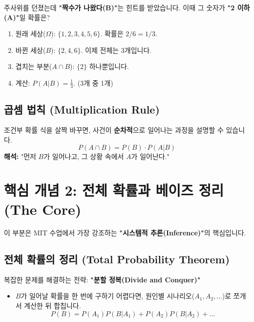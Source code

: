 \documentclass[11pt,a4paper]{book}
\theoremstyle{definition}
\begin{document}
\begin{examplebox}[title={주사위 던지기}]
주사위를 던졌는데 \textbf{"짝수가 나왔다(B)"}는 힌트를 받았습니다. 이때 그 숫자가 \textbf{"2 이하(A)"}일 확률은?
\begin{enumerate}
    \item 원래 세상($\Omega$): $\{1, 2, 3, 4, 5, 6\}$. 확률은 $2/6 = 1/3$.
    \item 바뀐 세상($B$): $\{2, 4, 6\}$. 이제 전체는 3개입니다.
    \item 겹치는 부분($A \cap B$): $\{2\}$ 하나뿐입니다.
    \item 계산: $P(A|B) = \frac{1}{3}$. (3개 중 1개)
\end{enumerate}
\end{examplebox}

\subsection{곱셈 법칙 (Multiplication Rule)}
조건부 확률 식을 살짝 바꾸면, 사건이 \textbf{순차적}으로 일어나는 과정을 설명할 수 있습니다.
\[ P(A \cap B) = P(B) \cdot P(A|B) \]
\textbf{해석:} "먼저 $B$가 일어나고, 그 상황 속에서 $A$가 일어난다."

\section{핵심 개념 2: 전체 확률과 베이즈 정리 (The Core)}

이 부분은 MIT 수업에서 가장 강조하는 \textbf{"시스템적 추론(Inference)"}의 핵심입니다.

\subsection{전체 확률의 정리 (Total Probability Theorem)}
복잡한 문제를 해결하는 전략: \textbf{"분할 정복(Divide and Conquer)"}
\begin{itemize}
    \item $B$가 일어날 확률을 한 번에 구하기 어렵다면, 원인별 시나리오($A_1, A_2, \dots$)로 쪼개서 계산한 뒤 합칩니다.
    \[ P(B) = P(A_1)P(B|A_1) + P(A_2)P(B|A_2) + \dots \]
\end{itemize}
\end{document}
